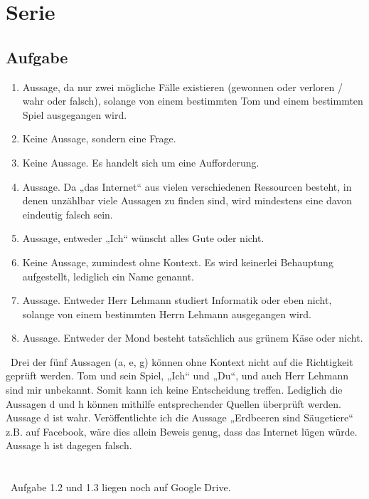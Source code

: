 \newpage

\section{Serie}
    
    \subsection{Aufgabe}
    
    \begin{enumerate}
        \item Aussage, da nur zwei mögliche Fälle existieren (gewonnen oder verloren / wahr oder falsch), solange von einem bestimmten Tom und einem bestimmten Spiel ausgegangen wird.
        \item Keine Aussage, sondern eine Frage.
        \item Keine Aussage. Es handelt sich um eine Aufforderung.
        \item Aussage. Da „das Internet“ aus vielen verschiedenen Ressourcen besteht, in denen unzählbar viele Aussagen zu finden sind, wird mindestens eine davon eindeutig falsch sein.
        \item Aussage, entweder „Ich“ wünscht alles Gute oder nicht. 
        \item Keine Aussage, zumindest ohne Kontext. Es wird keinerlei Behauptung aufgestellt, lediglich ein Name genannt.
        \item Aussage. Entweder Herr Lehmann studiert Informatik oder eben nicht, solange von einem bestimmten Herrn Lehmann ausgegangen wird.
        \item Aussage. Entweder der Mond besteht tatsächlich aus grünem Käse oder nicht.
    \end{enumerate}
    \
    Drei der fünf Aussagen (a, e, g) können ohne Kontext nicht auf die Richtigkeit geprüft werden. Tom und sein Spiel, „Ich“ und „Du“, und auch Herr Lehmann sind mir unbekannt. Somit kann ich keine Entscheidung treffen.
    Lediglich die Aussagen d und h können mithilfe entsprechender Quellen überprüft werden. Aussage d ist wahr. Veröffentlichte ich die Aussage „Erdbeeren sind Säugetiere“ z.B. auf Facebook, wäre dies allein Beweis genug, dass das Internet lügen würde. Aussage h ist dagegen falsch. \\\\\\
    \
    Aufgabe 1.2 und 1.3 liegen noch auf Google Drive.
